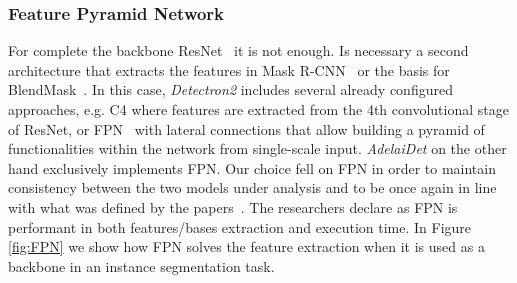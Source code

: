 \documentclass[10pt,twocolumn,letterpaper]{article}
\begin{document}
\subsubsection{Feature Pyramid Network}
For complete the backbone ResNet~\cite{Authors5_ResNet} it is not enough. Is necessary a second architecture that extracts the features in Mask R-CNN~\cite{Authors1_maskrcnn} or the basis for BlendMask~\cite{Authors2_BlendMask}. In this case, \textit{Detectron2} includes several already configured approaches, e.g. C4 where features are extracted from the 4th convolutional stage of ResNet, or FPN~\cite{FPN} with lateral connections that allow building a pyramid of functionalities within the network from single-scale input. \textit{AdelaiDet} on the other hand exclusively implements FPN. Our choice fell on FPN in order to maintain consistency between the two models under analysis and to be once again in line with what was defined by the papers~\cite{Authors1_maskrcnn, Authors2_BlendMask}. The researchers declare as FPN is performant in both features/bases extraction and execution time. In Figure \ref{fig:FPN} we show how FPN solves the feature extraction when it is used as a backbone in an instance segmentation task.
\end{document}
